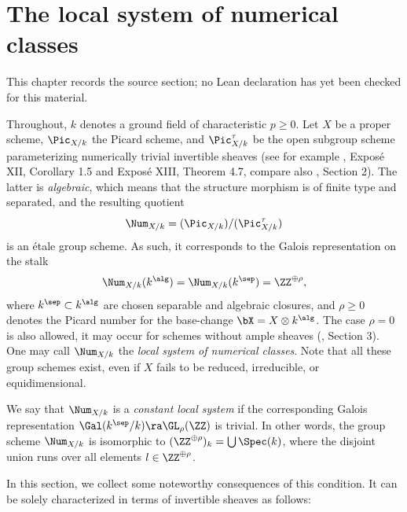 \chapter{The local system of numerical classes}
\label{no-enriques-surface-over-the-integers-chapter-02}

\begin{remark}
\label{no-enriques-surface-over-the-integers-chapter-02-source}
This chapter records the source section; no Lean declaration has yet been checked for this material.
\notready
\end{remark}

\label{Local system}

Throughout, $k$ denotes  a ground field of characteristic $p\geq 0$. Let $X$ be a proper scheme,   $\Pic_{X/k}$ the
Picard scheme, and $\Pic^\tau_{X/k}$ be the open subgroup scheme parameterizing numerically trivial
invertible sheaves  (see for example \cite{SGA-6}, Expos\'e XII, Corollary 1.5 and Expos\'e XIII, Theorem 4.7, compare also
\cite{Laurent-Schroeer-2021}, Section 2).
The latter is   \emph{algebraic}, which means that the structure morphism is of finite type and separated,
and the resulting quotient
$$
\Num_{X/k}=(\Pic_{X/k})/(\Pic^\tau_{X/k})
$$
is an \'etale group scheme.
As such, it corresponds to the Galois representation on the stalk
$$
\Num_{X/k}(k^\alg)=\Num_{X/k}(k^\sep)=\ZZ^{\oplus\rho},
$$
where  $k^\sep\subset k^\alg$ are chosen separable and algebraic closures,
and  $\rho\geq 0$ denotes the Picard number for the base-change $\bX=X\otimes k^\alg$.
The case $\rho=0$ is also allowed, it   may occur  for   schemes without ample sheaves (\cite{Schroeer-1999}, Section 3).
One may call  $\Num_{X/k}$  the \emph{local system  of numerical classes}.
Note that all these group schemes exist, even if $X$ fails to be reduced, irreducible,
or equidimensional.

We say that   $\Num_{X/k}$  is a  \emph{constant local system} if the corresponding Galois representation $\Gal(k^\sep/k)\ra\GL_\rho(\ZZ)$
is trivial. In other words, the group scheme  $\Num_{X/k}$  is isomorphic to
$(\ZZ^{\oplus\rho})_k=\bigcup\Spec(k)$, where the disjoint union runs over all elements $l\in\ZZ^{\oplus\rho}$.

In this section, we collect some noteworthy consequences of this condition. It can be solely characterized in terms
of invertible sheaves as follows:

